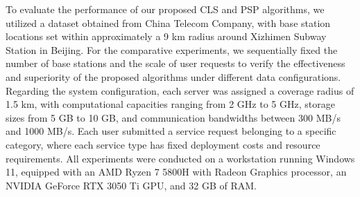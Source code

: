 \documentclass[10pt, conference, letterpaper]{IEEEtran}
\begin{document}

To evaluate the performance of our proposed CLS and PSP algorithms, we utilized a dataset obtained from China Telecom Company, with base station locations set within approximately a 9 km radius around Xizhimen Subway Station in Beijing. For the comparative experiments, we sequentially fixed the number of base stations and the scale of user requests to verify the effectiveness and superiority of the proposed algorithms under different data configurations. 
Regarding the system configuration, each server was assigned a coverage radius of 1.5 km, with computational capacities ranging from 2 GHz to 5 GHz, storage sizes from 5 GB to 10 GB, and communication bandwidths between 300 MB/s and 1000 MB/s. Each user submitted a service request belonging to a specific category, where each service type has fixed deployment costs and resource requirements. All experiments were conducted on a workstation running Windows 11, equipped with an AMD Ryzen 7 5800H with Radeon Graphics processor, an NVIDIA GeForce RTX 3050 Ti GPU, and 32 GB of RAM.

\end{document}
